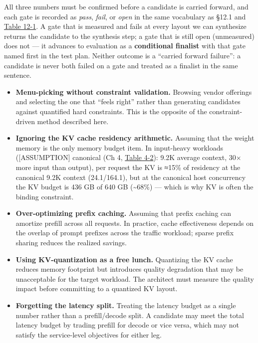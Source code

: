 All three numbers must be confirmed before a candidate is carried
forward, and each gate is recorded as \emph{pass}, \emph{fail}, or
\emph{open} in the same vocabulary as §12.1 and \hyperref[tab:12.1]{Table 12-1}. A gate that
is measured and fails at every layout we can synthesize returns the
candidate to the synthesis step; a gate that is still open (unmeasured)
does not --- it advances to evaluation as a \textbf{conditional
finalist} with that gate named first in the test plan. Neither outcome
is a ``carried forward failure'': a candidate is never both failed on a
gate and treated as a finalist in the same sentence.

\label{common-mistakes}


\begin{itemize}
\tightlist
\item
  \textbf{Menu-picking without constraint validation.} Browsing vendor
  offerings and selecting the one that ``feels right'' rather than
  generating candidates against quantified hard constraints. This is the
  opposite of the constraint-driven method described here.
\item
  \textbf{Ignoring the KV cache residency arithmetic.} Assuming that the
  weight memory is the only memory budget item. In input-heavy workloads
  (\mbox{{[}ASSUMPTION{]}} canonical (Ch 4, \hyperref[tab:4.2]{Table 4-2}): 9.2K average context,
  30× more input than output), per request the KV is ≈15\% of residency
  at the canonical 9.2K context (24.1/164.1), but at the canonical host
  concurrency the KV budget is 436 GB of 640 GB (\textasciitilde68\%)
  --- which is why KV is often the binding constraint.
\item
  \textbf{Over-optimizing prefix caching.} Assuming that prefix caching
  can amortize prefill across all requests. In practice, cache
  effectiveness depends on the overlap of prompt prefixes across the
  traffic workload; sparse prefix sharing reduces the realized savings.
\item
  \textbf{Using KV-quantization as a free lunch.} Quantizing the KV
  cache reduces memory footprint but introduces quality degradation that
  may be unacceptable for the target workload. The architect must
  measure the quality impact before committing to a quantized KV layout.
\item
  \textbf{Forgetting the latency split.} Treating the latency budget as
  a single number rather than a prefill/decode split. A candidate may
  meet the total latency budget by trading prefill for decode or vice
  versa, which may not satisfy the service-level objectives for either
  leg.
\end{itemize}

